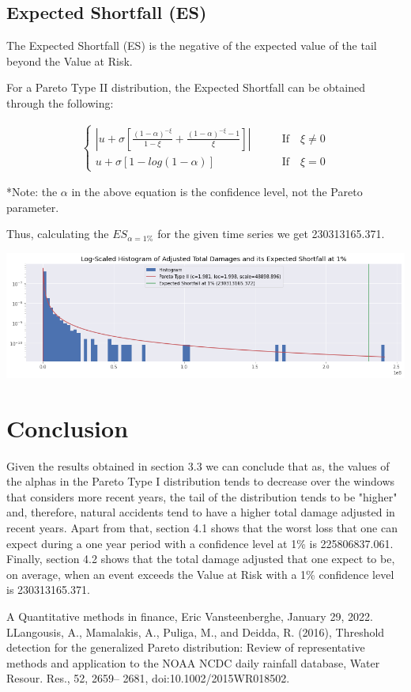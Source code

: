 \documentclass[paper=a4, fontsize=11pt]{scrartcl} %
\begin{document}
\subsection{Expected Shortfall (ES)}

The Expected Shortfall (ES) is the negative of the expected value of the tail beyond the Value at Risk. 

For a Pareto Type II distribution, the Expected Shortfall can be obtained through the following:

\begin{align*}
    \begin{cases}
        \left| u + \sigma \left[\frac{(1-\alpha)^{-\xi}}{1-\xi} + \frac{(1-\alpha)^{-\xi}-1}{\xi}\right] \right| \qquad & \text{If} \quad \xi \neq 0  \\
        u + \sigma [1 - log(1-\alpha)] \qquad & \text{If} \quad \xi = 0
    \end{cases}
\end{align*}

*Note: the $\alpha$ in the above equation is the confidence level, not the Pareto parameter.

Thus, calculating the $ES_{\alpha=1\%}$ for the given time series we get 230313165.371.

\begin{center}
    \includegraphics[scale=0.5]{imgs/ES.png}
\end{center}

\section{Conclusion}
Given the results obtained in section 3.3 we can conclude that as, the values of the alphas in the Pareto Type I distribution tends to decrease over the windows that considers more recent years, the tail of the distribution tends to be "higher" and, therefore, natural accidents tend to have a higher total damage adjusted in recent years. Apart from that, section 4.1 shows that the worst loss that one can expect during a one year period with a confidence level at 1\% is 225806837.061. Finally, section 4.2 shows that the total damage adjusted that one expect to be, on average, when an event exceeds the Value at Risk with a 1\% confidence level is 230313165.371.


\newpage
\begin{thebibliography}{9}
    \bibitem A Quantitative methods in finance, Eric Vansteenberghe, January 29, 2022.
    \bibitem LLangousis, A., Mamalakis, A., Puliga, M., and Deidda, R. (2016), Threshold detection for the generalized Pareto distribution: Review of representative methods and application to the NOAA NCDC daily rainfall database, Water Resour. Res., 52, 2659– 2681, doi:10.1002/2015WR018502.
\end{thebibliography}
\end{document}
